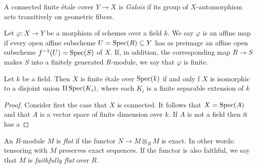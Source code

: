 \begin{definition}
  A connected finite \'etale cover $Y \to X$ is \textit{Galois} if its group of $X$-automorphism acts transitively on geometric fibers.
\end{definition}


\begin{definition}
  Let $\varphi: X \to Y$ be a morphism of schemes over a field $k$. We say $\varphi$ is an affine map if every open affine subscheme $U = \operatorname{Spec}(R) \subseteq Y$ has as preimage an affine open subscheme $f^{-1}(U) = \operatorname{Spec}(S)$ of $X$. If, in addition, the corresponding map $R \to S$ makes $S$ into a finitely generated $R$-module, we say that $\varphi$ is finite.
\end{definition}

\begin{proposition}
Let $k$ be a field. Then $X$ is finite \'etale over $\operatorname{Spec}(k)$ if and only f $X$ is isomorphic to a disjoint union $\amalg \operatorname{Spec}(K_i)$, where each $K_i$ is a finite separable extension of $k$
\end{proposition}
\begin{proof}
  Consider first the case that $X$ is connected. It follows that $X = \operatorname{Spec}(A)$ and that $A$ is a vector space of finite dimension over $k$. If $A$ is not a field then it has a
\end{proof}



\begin{definition}
   An $R$-module $M$ is \textit{flat} if the functor $N \to M \otimes_R M$ is exact. In other words: tensoring with $M$ preserves exact sequences. If the functor is also faithful, we say that $M$ is \textit{faithfully flat} over $R$.
\end{definition}

%
%